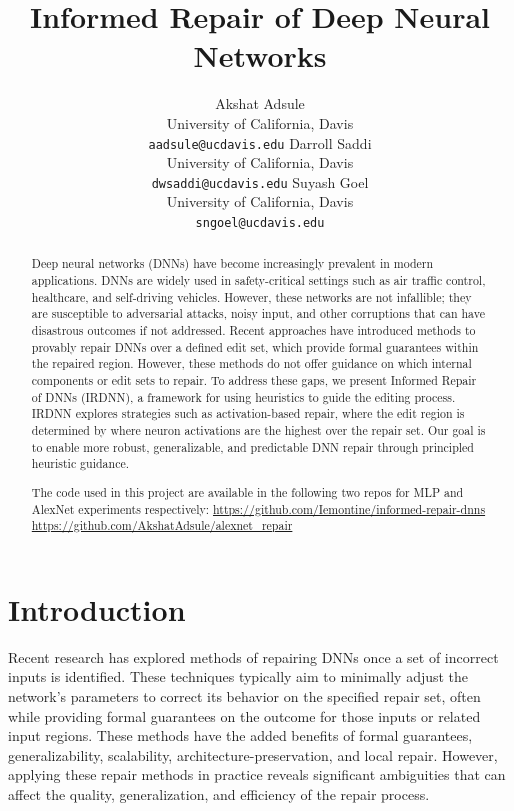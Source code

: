 \documentclass{article}
\title{Informed Repair of Deep Neural Networks}
\begin{document}
\author{
	Akshat Adsule \\
	University of California, Davis \\
	\texttt{aadsule@ucdavis.edu}
	\And
	Darroll Saddi \\
	University of California, Davis \\
	\texttt{dwsaddi@ucdavis.edu}
	\And
	Suyash Goel \\
	University of California, Davis \\
	\texttt{sngoel@ucdavis.edu}
}

\maketitle

\begin{abstract}
	Deep neural networks (DNNs) have become increasingly prevalent in modern applications.
	DNNs are widely used in safety-critical settings such as air traffic control, healthcare, and self-driving vehicles.
	However, these networks are not infallible; they are susceptible to adversarial attacks, noisy input, and other corruptions that can have disastrous outcomes if not addressed.
	Recent approaches have introduced methods to provably repair DNNs over a defined edit set, which provide formal guarantees within the repaired region.
	However, these methods do not offer guidance on which internal components or edit sets to repair.
	To address these gaps, we present Informed Repair of DNNs (IRDNN), a framework for using heuristics to guide the editing process.
	IRDNN explores strategies such as activation-based repair, where the edit region is determined by where neuron activations are the highest over the repair set.
	Our goal is to enable more robust, generalizable, and predictable DNN repair through principled heuristic guidance.

	The code used in this project are available in the following two repos for MLP and AlexNet experiments respectively:
	\url{https://github.com/Iemontine/informed-repair-dnns}
	\url{https://github.com/AkshatAdsule/alexnet_repair}
\end{abstract}

\section{Introduction}

Recent research \citep{nawas_provable_2024, sotoudeh_provable_2021, tao_architecture-preserving_2023} has explored methods of repairing DNNs once a set of incorrect inputs is identified.
These techniques typically aim to minimally adjust the network's parameters to correct its behavior on the specified repair set, often while providing formal guarantees on the outcome for those inputs or related input regions.
These methods have the added benefits of formal guarantees, generalizability, scalability, architecture-preservation, and local repair.
However, applying these repair methods in practice reveals significant ambiguities that can affect the quality, generalization, and efficiency of the repair process.
\end{document}
